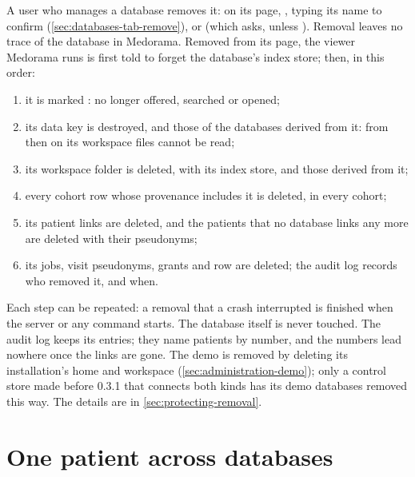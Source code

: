 A user who manages a database removes it: on its page, , typing its name to
confirm (\cref{sec:databases-tab-remove}), or  (which asks,
unless ). Removal leaves no trace of the database in Medorama. Removed from its page,
the viewer Medorama runs is first told to forget the database's index store; then, in this order:
\begin{enumerate}
\item it is marked : no longer offered, searched or opened;
\item its data key is destroyed, and those of the databases derived from it: from then on its
  workspace files cannot be read;
\item its workspace folder is deleted, with its index store, and those derived from it;
\item every cohort row whose provenance includes it is deleted, in every cohort;
\item its patient links are deleted, and the patients that no database links any more are
  deleted with their pseudonyms;
\item its jobs, visit pseudonyms, grants and row are deleted; the audit log records who removed it, and when.
\end{enumerate}
Each step can be repeated: a removal that a crash interrupted is finished when the server or any
command starts. The database itself is never touched. The audit log keeps its entries; they name
patients by number, and the numbers lead nowhere once the links are gone. The demo is removed
by deleting its installation's home and workspace (\cref{sec:administration-demo}); only a
control store made before 0.3.1 that connects both kinds has its demo databases removed this way.
The details are in \cref{sec:protecting-removal}.

\section{One patient across databases}
\label{sec:administration-identity}

